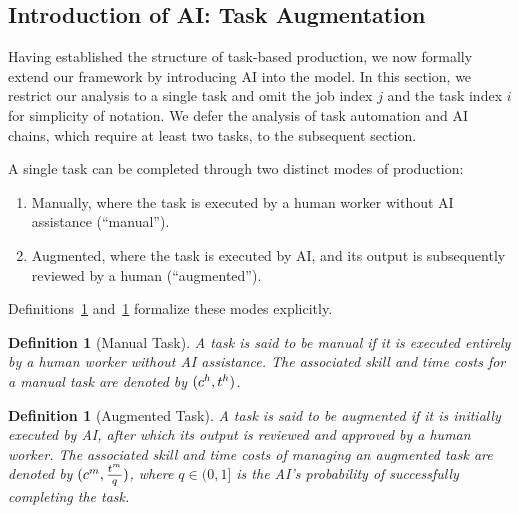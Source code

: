 \documentclass{article}
\theoremstyle{plain}
\theoremstyle{plain}
\newtheorem{definition}[theorem]{Definition}
\begin{document}
\subsection{Introduction of AI: Task Augmentation}

Having established the structure of task-based production, we now formally extend our framework by introducing AI into the model.
In this section, we restrict our analysis to a single task and omit the job index $j$ and the task index $i$ for simplicity of notation.
We defer the analysis of task automation and AI chains, which require at least two tasks, to the subsequent section.

A single task can be completed through two distinct modes of production:
\begin{enumerate}
\item Manually, where the task is executed by a human worker without AI assistance (``manual'').
\item Augmented, where the task is executed by AI, and its output is subsequently reviewed by a human (``augmented'').
\end{enumerate}

Definitions~\ref{def:manual_task} and~\ref{def:augmented_task} formalize these modes explicitly.

\begin{definition}[Manual Task]
\label{def:manual_task}
A task is said to be manual if it is executed entirely by a human worker without AI assistance.
The associated skill and time costs for a manual task are denoted by $(c^{h}_{}, t^{h}_{})$.
\end{definition}

\begin{definition}[Augmented Task]
\label{def:augmented_task}
A task is said to be augmented if it is initially executed by AI, after which its output is reviewed and approved by a human worker.
The associated skill and time costs of managing an augmented task are denoted by $(c^{m}_{}, \frac{t^{m}_{}}{q})$, where $q \in (0,1]$ is the AI's probability of successfully completing the task.
\end{definition}
\end{document}
